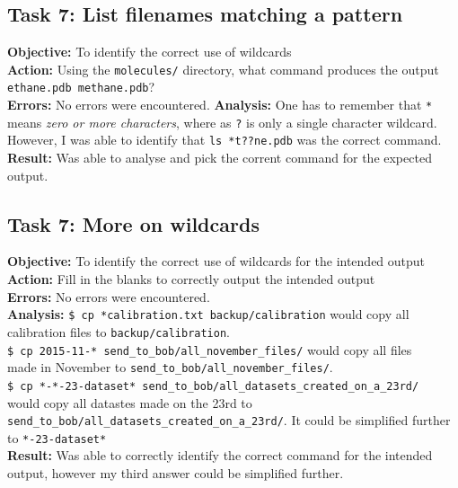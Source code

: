 \documentclass{article}
\begin{document}
\subsection{Task 7: List filenames matching a pattern}
%
\textbf{Objective:} To identify the correct use of wildcards\\
\textbf{Action:} Using the \texttt{molecules/} directory, what command produces the output \texttt{ethane.pdb methane.pdb}?\\
\textbf{Errors:} No errors were encountered.
\textbf{Analysis:} One has to remember that \verb|*| means \textit{zero or more characters}, where as \verb|?| is only a single character wildcard. However, I was able to identify that \verb|ls *t??ne.pdb| was the correct command.\\
\textbf{Result:} Was able to analyse and pick the corrent command for the expected output.
%
\subsection{Task 7: More on wildcards}
%
\textbf{Objective:} To identify the correct use of wildcards for the intended output
\textbf{Action:} Fill in the blanks to correctly output the intended output\\
\textbf{Errors:} No errors were encountered.\\
\textbf{Analysis:} \verb|$ cp *calibration.txt backup/calibration| would copy all calibration files to \verb|backup/calibration|.\\
\verb|$ cp 2015-11-* send_to_bob/all_november_files/| would copy all files \\made in November to \verb|send_to_bob/all_november_files/|.\\
\verb|$ cp *-*-23-dataset* send_to_bob/all_datasets_created_on_a_23rd/|\\ would copy all datastes made on the 23rd to \\\verb|send_to_bob/all_datasets_created_on_a_23rd/|. It could be simplified further to \verb|*-23-dataset*|\\
\textbf{Result:} Was able to correctly identify the correct command for the intended output, however my third answer could be simplified further.
%
\end{document}
